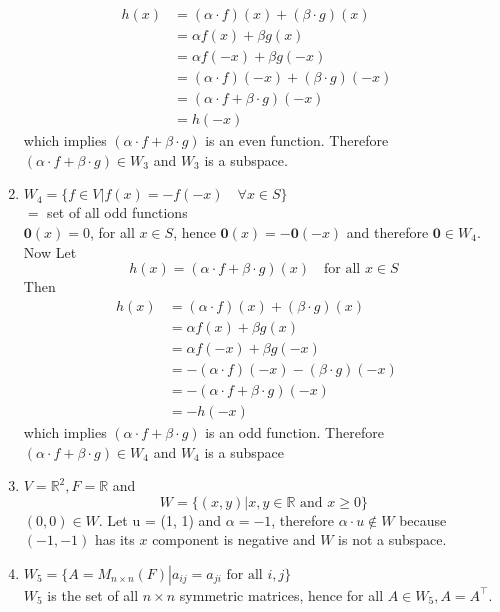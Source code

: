 \documentclass[a4paper, titlepage]{article}
\begin{document}
\begin{enumerate}[label=\textbf{\arabic*.}]
\begin{align*}
        h(x) &= (\alpha\cdot f)(x) + (\beta\cdot g)(x) \quad \\
            &= \alpha f(x) + \beta g(x) \\
            &= \alpha f(-x) + \beta g(-x) \\
            &= (\alpha\cdot f)(-x) + (\beta\cdot g)(-x) \quad \\
            &= (\alpha\cdot f + \beta\cdot g)(-x) \quad \\
            &= h(-x)
    \end{align*}
    which implies $(\alpha\cdot f + \beta\cdot g)$ is an even function.
    Therefore $(\alpha\cdot f + \beta\cdot g) \in W_3$ and $W_3$ is a
    subspace.
    \item $W_4 = \{ f \in V \left. \right\vert f(x) = -f(-x) \quad \forall x \in S \} $ \hfill \\
    $ = $ set of all odd functions \hfill \\
    $\textbf{0}(x) = 0$, for all $x \in S$, hence 
    $\textbf{0}(x) = -\textbf{0}(-x)$ and therefore $\textbf{0} \in W_4$. Now Let
    \[ h(x) = (\alpha\cdot f + \beta\cdot g)(x) \quad \text{for all } x \in S\]
    Then
    \begin{align*}
        h(x) &= (\alpha\cdot f)(x) + (\beta\cdot g)(x) \quad \\
            &= \alpha f(x) + \beta g(x) \\
            &= \alpha f(-x) + \beta g(-x) \\
            &= -(\alpha\cdot f)(-x) - (\beta\cdot g)(-x) \quad \\
            &= -(\alpha\cdot f + \beta\cdot g)(-x) \quad \\
            &= -h(-x)
    \end{align*}
    which implies $(\alpha\cdot f + \beta\cdot g)$ is an odd function.
    Therefore $(\alpha\cdot f + \beta\cdot g) \in W_4$ and $W_4$ is a
    subspace 
    \item $V = \mathbb{R}^2, F = \mathbb{R}$ and 
    $$W = \{ (x, y) \vert x, y \in \mathbb{R} \text{ and } x \ge 0 \}$$
    $(0, 0) \in W$. Let u = (1, 1) and $\alpha = -1$, therefore 
    $\alpha\cdot u \notin W$ because $(-1, -1)$ has its $x$ component 
    is negative and $W$ is not a subspace.
    \item $W_5 = \{ A = M_{n\times n}(F) \left. \right\vert 
    a_{ij} = a_{ji} \text{ for all } i, j \}$ \hfill \\
    $W_5$ is the set of all $n\times n$ symmetric matrices, hence for
    all $A \in W_5,{} A = A^\intercal$. \hfill \\

\end{enumerate}
\end{document}
